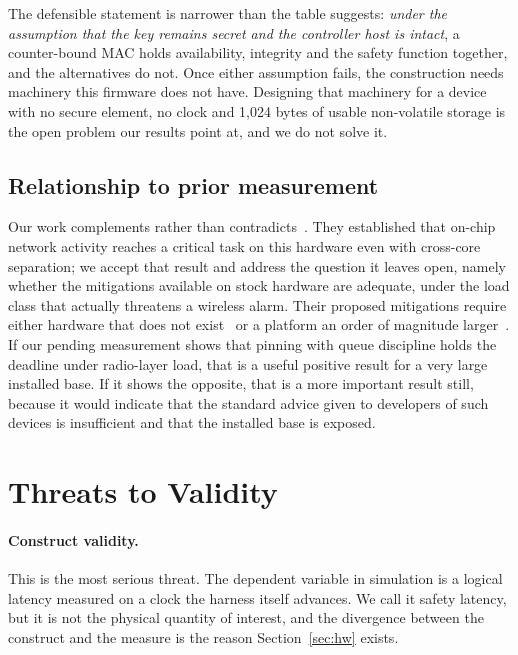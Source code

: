 The defensible statement is narrower than the table suggests: \emph{under the assumption that the
key remains secret and the controller host is intact}, a counter-bound MAC holds availability,
integrity and the safety function together, and the alternatives do not. Once either assumption
fails, the construction needs machinery this firmware does not have. Designing that machinery for a
device with no secure element, no clock and 1{,}024 bytes of usable non-volatile storage is the
open problem our results point at, and we do not solve it.

\subsection{Relationship to prior measurement}

Our work complements rather than contradicts~\cite{behnke2020}. They established that on-chip
network activity reaches a critical task on this hardware even with cross-core separation; we
accept that result and address the question it leaves open, namely whether the mitigations
available on stock hardware are adequate, under the load class that actually threatens a wireless
alarm. Their proposed mitigations require either hardware that does not
exist~\cite{behnke2022} or a platform an order of magnitude larger~\cite{behnke2023}. If our
pending measurement shows that pinning with queue discipline holds the deadline under radio-layer
load, that is a useful positive result for a very large installed base. If it shows the opposite,
that is a more important result still, because it would indicate that the standard advice given
to developers of such devices is insufficient and that the installed base is exposed.

\section{Threats to Validity}\label{sec:threats}

\paragraph{Construct validity.} This is the most serious threat. The dependent variable in
simulation is a logical latency measured on a clock the harness itself advances. We call it
safety latency, but it is not the physical quantity of interest, and the divergence between the
construct and the measure is the reason Section~\ref{sec:hw} exists.

